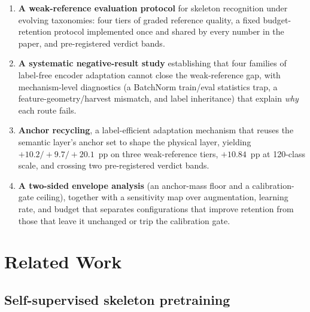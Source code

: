 \documentclass[preprint,12pt,number]{elsarticle}
\begin{document}
\begin{enumerate}
\item \textbf{A weak-reference evaluation protocol} for skeleton recognition under
  evolving taxonomies: four tiers of graded reference quality, a fixed
  budget-retention protocol implemented once and shared by every number in the
  paper, and pre-registered verdict bands.
\item \textbf{A systematic negative-result study} establishing that four families of
  label-free encoder adaptation cannot close the weak-reference gap, with
  mechanism-level diagnostics (a BatchNorm train/eval statistics trap, a
  feature-geometry/harvest mismatch, and label inheritance) that explain
  \emph{why} each route fails.
\item \textbf{Anchor recycling}, a label-efficient adaptation mechanism that reuses
  the semantic layer's anchor set to shape the physical layer, yielding
  $+10.2/+9.7/+20.1$~pp on three weak-reference tiers, $+10.84$~pp at
  120-class scale, and crossing two
  pre-registered verdict bands.
\item \textbf{A two-sided envelope analysis} (an anchor-mass floor and a
  calibration-gate ceiling), together with a sensitivity map over
  augmentation, learning rate, and budget that separates configurations
  that improve retention from those that leave it unchanged or trip the
  calibration gate.
\end{enumerate}

\section{Related Work}

\subsection{Self-supervised skeleton pretraining}
\end{document}
